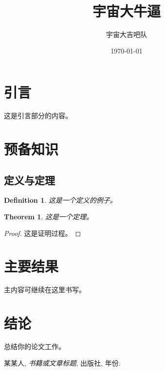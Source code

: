 \documentclass[12pt, a4paper]{article}
\title{\Huge\bfseries 宇宙大牛逼}
\author{\Large 宇宙大吉吧队}
\date{\Large \today}
\newtheorem{theorem}{Theorem}[section]
\newtheorem{definition}{Definition}[section]
\begin{document}
\maketitle
\thispagestyle{empty} %
\newpage

\tableofcontents
\newpage

\section{引言}

这是引言部分的内容。

\section{预备知识}

\subsection{定义与定理}

\begin{definition}
这是一个定义的例子。
\end{definition}

\begin{theorem}
这是一个定理。
\end{theorem}

\begin{proof}
这是证明过程。
\end{proof}

\section{主要结果}

主内容可继续在这里书写。

\section{结论}

总结你的论文工作。

\newpage
\begin{thebibliography}{9}
 某某人, \emph{书籍或文章标题}, 出版社, 年份.
\end{thebibliography}
\end{document}

